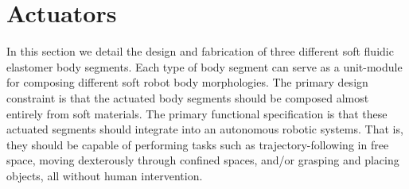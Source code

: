 \section{Actuators}
\label{sec:Actuators}
In this section we detail the design and fabrication of three different soft fluidic elastomer body segments.
%
Each type of body segment can serve as a unit-module for composing different soft robot body morphologies.
%
The primary design constraint is that the actuated body segments should be composed almost entirely from soft materials.
%
The primary functional specification is that these actuated segments should integrate into an autonomous robotic systems.
%
That is, they should be capable of performing tasks such as trajectory-following in free space, moving dexterously through confined spaces, and/or grasping and placing objects, all without human intervention.





